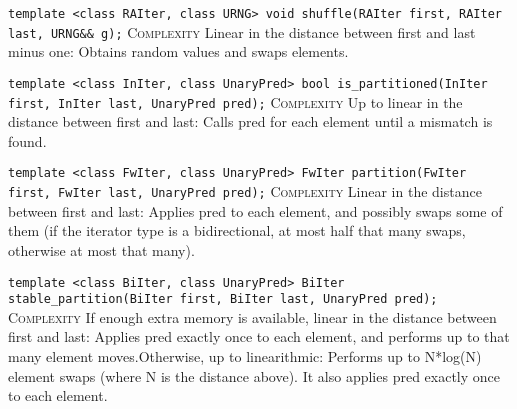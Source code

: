 \noindent{}\hspace*{0.25em}\lstinline[basicstyle=\ttfamily\color{corange}]{template <class RAIter, class URNG> void shuffle(RAIter first, RAIter last, URNG&& g);} \textsc{Complexity} Linear in the distance between first and last minus one: Obtains random values and swaps elements.\\\vspace{-0.6em}

\noindent{}\hspace*{0.25em}\lstinline[basicstyle=\ttfamily\color{corange}]{template <class InIter, class UnaryPred> bool is_partitioned(InIter first, InIter last, UnaryPred pred);} \textsc{Complexity} Up to linear in the distance between first and last: Calls pred for each element until a mismatch is found.\\\vspace{-0.6em}

\noindent{}\hspace*{0.25em}\lstinline[basicstyle=\ttfamily\color{corange}]{template <class FwIter, class UnaryPred> FwIter partition(FwIter first, FwIter last, UnaryPred pred);} \textsc{Complexity} Linear in the distance between first and last: Applies  pred to each element, and possibly swaps some of them (if the iterator type is a bidirectional, at most half that many swaps, otherwise at most that many).\\\vspace{-0.6em}

\noindent{}\hspace*{0.25em}\lstinline[basicstyle=\ttfamily\color{cred}]{template <class BiIter, class UnaryPred> BiIter stable_partition(BiIter first, BiIter last, UnaryPred pred);} \textsc{Complexity} If enough extra memory is available, linear in the distance between first and last: Applies pred exactly once to each element, and performs up to that many element moves.Otherwise, up to linearithmic: Performs up to N*log(N) element swaps (where N is the distance above). It also applies pred exactly once to each element.\\\vspace{-0.6em}

